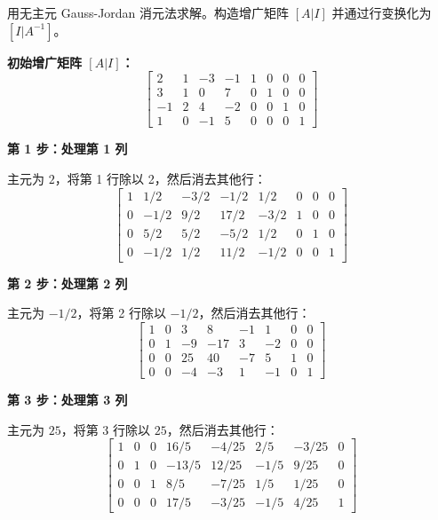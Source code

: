 \documentclass{article}
\begin{document}
\begin{solution}
  用无主元 Gauss-Jordan 消元法求解。构造增广矩阵 $[A | I]$ 并通过行变换化为 $[I | A^{-1}]$。

  \textbf{初始增广矩阵 $[A | I]$：}
  \[
    \left[
      \begin{array}{cccc|cccc}
        2 & 1 & -3 & -1 & 1 & 0 & 0 & 0 \\
        3 & 1 & 0 & 7 & 0 & 1 & 0 & 0 \\
        -1 & 2 & 4 & -2 & 0 & 0 & 1 & 0 \\
        1 & 0 & -1 & 5 & 0 & 0 & 0 & 1
    \end{array}\right]
  \]

  \textbf{第 1 步：处理第 1 列}

  主元为 $2$，将第 1 行除以 2，然后消去其他行：
  \[
    \left[
      \begin{array}{cccc|cccc}
        1 & 1/2 & -3/2 & -1/2 & 1/2 & 0 & 0 & 0 \\
        0 & -1/2 & 9/2 & 17/2 & -3/2 & 1 & 0 & 0 \\
        0 & 5/2 & 5/2 & -5/2 & 1/2 & 0 & 1 & 0 \\
        0 & -1/2 & 1/2 & 11/2 & -1/2 & 0 & 0 & 1
    \end{array}\right]
  \]

  \textbf{第 2 步：处理第 2 列}

  主元为 $-1/2$，将第 2 行除以 $-1/2$，然后消去其他行：
  \[
    \left[
      \begin{array}{cccc|cccc}
        1 & 0 & 3 & 8 & -1 & 1 & 0 & 0 \\
        0 & 1 & -9 & -17 & 3 & -2 & 0 & 0 \\
        0 & 0 & 25 & 40 & -7 & 5 & 1 & 0 \\
        0 & 0 & -4 & -3 & 1 & -1 & 0 & 1
    \end{array}\right]
  \]

  \textbf{第 3 步：处理第 3 列}

  主元为 $25$，将第 3 行除以 $25$，然后消去其他行：
  \[
    \left[
      \begin{array}{cccc|cccc}
        1 & 0 & 0 & 16/5 & -4/25 & 2/5 & -3/25 & 0 \\
        0 & 1 & 0 & -13/5 & 12/25 & -1/5 & 9/25 & 0 \\
        0 & 0 & 1 & 8/5 & -7/25 & 1/5 & 1/25 & 0 \\
        0 & 0 & 0 & 17/5 & -3/25 & -1/5 & 4/25 & 1
    \end{array}\right]
  \]


\end{solution}
\end{document}
